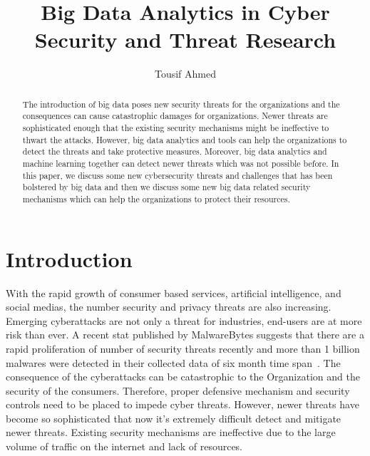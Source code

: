 \documentclass[sigconf]{acmart}
\begin{document}
\title{Big Data Analytics in Cyber Security and Threat Research}


\author{Tousif Ahmed}


\renewcommand{\shortauthors}{B. Trovato et al.}


\begin{abstract}
The introduction of big data poses new security threats for the organizations and the consequences can cause catastrophic damages for organizations. Newer threats are sophisticated enough that the existing security mechanisms might be ineffective to thwart the attacks. However, big data analytics and tools can help the organizations to detect the threats and take protective measures. Moreover, big data analytics and machine learning together can detect newer threats which was not possible before. In this paper, we discuss some new cybersecurity threats and challenges that has been bolstered by big data and then we discuss some new big data related security mechanisms which can help the organizations to protect their resources. 
\end{abstract}



\maketitle

\section*{Introduction}

With the rapid growth of consumer based services, artificial intelligence, and social medias, the number security and privacy threats are also increasing. Emerging cyberattacks are not only a threat for industries, end-users are at more risk than ever. A recent stat published by MalwareBytes suggests that there are a rapid proliferation of number of security threats recently and more than 1 billion malwares were detected in their collected data of six month time span~\cite{malware}. The consequence of the cyberattacks can be catastrophic to the Organization and the security of the consumers. Therefore, proper defensive mechanism and security controls need to be placed to impede cyber threats. However, newer threats have become so sophisticated that now it's extremely difficult detect and mitigate newer threats. Existing security mechanisms are ineffective due to the large volume of traffic on the internet and lack of resources.  
\end{document}
